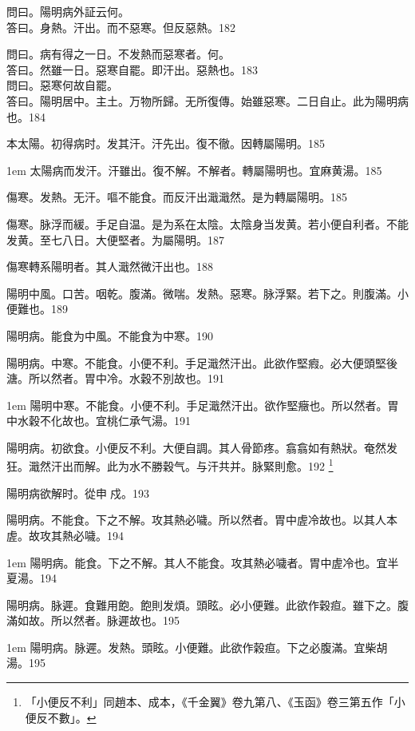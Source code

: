 問曰。陽明病外証云何。\\
答曰。身熱。汗出。而不惡寒。{\khaai 但}反惡熱。182

問曰。病有得之一日。不发熱而惡寒者。何。\\
答曰。然雖一日。惡寒自罷。即汗出。惡熱也。183\\
問曰。惡寒何故自罷。\\
答曰。陽明居中。主土。万物所歸。无所復傳。始雖惡寒。二日自止。此为陽明病也。184

{\khaai 本}太陽。初得病时。发其汗。汗先出{\khaai 。復}不徹。因轉屬陽明。185

\hangindent 1em
太陽病而发汗。汗雖出。復不解。不解者。轉屬陽明也。宜麻黄湯。{\shenghui}185

傷寒。发熱。无汗。嘔不能食。而反汗出濈濈然。是为轉屬陽明。185

傷寒。脉浮而緩。手足自温。是为系在太陰。太陰{\khaai 身}当发黄。若小便自利者。不能发黄。至七八日。大便堅者。为屬陽明。187

傷寒轉系陽明者。其人濈然微汗出也。188

陽明中風。口苦。咽乾。腹滿。微喘。发熱。惡寒。脉浮緊。若下之。則腹滿。小便難也。189

陽明病。能食为中風。不能食为中寒。190

陽明{\khaai 病。}中寒。不能食。小便不利。手足濈然汗出。此欲作堅瘕。必大便頭堅後溏。所以然者。胃中冷。水穀不別故也。191

\hangindent 1em
陽明中寒。不能食。小便不利。手足濈然汗出。欲作堅癥也。所以然者。胃中水穀不化故也。宜桃仁承气湯。{\shenghui}191

陽明病。初欲食。小便反不利。大便自調。其人骨節疼。翕翕如有熱狀。奄然发狂。濈然汗出而解。此为水不勝穀气。与汗共并。脉緊則愈。192
	\footnote{
		「小便反不利」同趙本、成本，《千金翼》卷九第八、《玉函》卷三第五作「小便反不數」。
	}

陽明病欲解时。從申{\sungii 𥁞}戍。193

陽明病。不能食。下之不解。攻其熱必噦。所以然者。胃中虗冷故也。{\khaai 以其人本虗。故攻其熱必噦。}194

\hangindent 1em
陽明病。能食。下之不解。其人不能食。攻其熱必噦者。胃中虗冷也。宜半夏湯。{\shenghui}194

陽明病。脉遲。食難用飽。飽則发煩。頭眩。必小便難。此欲作穀疸。雖下之。腹滿如故。所以然者。脉遲故也。195

\hangindent 1em
陽明病。脉遲。发熱。頭眩。小便難。此欲作榖疸。下之必腹滿。宜柴胡湯。{\shenghui}195

